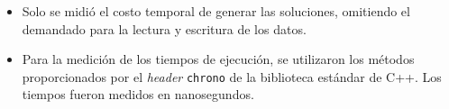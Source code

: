\begin{enumerate}[label=(\roman*)]
\begin{itemize}
\item Solo se midió el costo temporal de generar las soluciones,
omitiendo el demandado para la lectura y escritura de los datos.
\item Para la medición de los tiempos de ejecución, se utilizaron los
métodos proporcionados por el \emph{header} \texttt{chrono} de la
biblioteca estándar de C++. Los tiempos fueron medidos en nanosegundos.
\end{itemize}

\end{enumerate}
